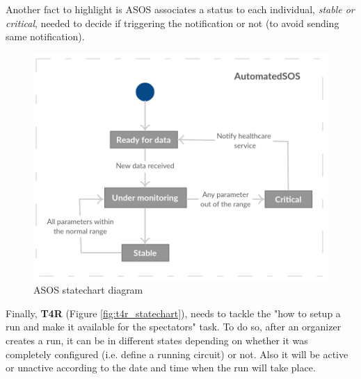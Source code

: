 \documentclass[hidelinks, 12pt]{report}
\begin{document}
	Another fact to highlight is ASOS associates a status to each individual, \textit{stable or critical}, needed to decide if triggering the notification or not (to avoid sending same notification). \\
	
	\begin{figure}[H]
		\centering
		\includegraphics[scale=0.55]{Diagrams/asos_statechart.png}
		\caption[ASOS statechart diagram]{ASOS statechart diagram}
		\label{fig:asos_statechart}
	\end{figure}
	
	Finally, \textbf {T4R} (Figure \ref{fig:t4r_statechart}), needs to tackle the "how to setup a run and make it available for the spectators" task. To do so, after an organizer creates a run, it can be in different states depending on whether it was completely configured (i.e. define a running circuit) or not. Also it will be active or unactive according to the date and time when the run will take place.
	
\end{document}

